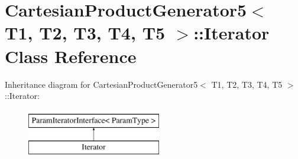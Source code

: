 \hypertarget{classtesting_1_1internal_1_1CartesianProductGenerator5_1_1Iterator}{\section{\-Cartesian\-Product\-Generator5$<$ \-T1, \-T2, \-T3, \-T4, \-T5 $>$\-:\-:\-Iterator \-Class \-Reference}
\label{d5/dc4/classtesting_1_1internal_1_1CartesianProductGenerator5_1_1Iterator}
}
\-Inheritance diagram for \-Cartesian\-Product\-Generator5$<$ \-T1, \-T2, \-T3, \-T4, \-T5 $>$\-:\-:\-Iterator\-:\begin{figure}[H]
\begin{center}
\leavevmode
\includegraphics[height=2.000000cm]{d5/dc4/classtesting_1_1internal_1_1CartesianProductGenerator5_1_1Iterator}
\end{center}
\end{figure}
